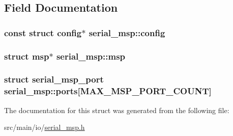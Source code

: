 \subsection{Field Documentation}
\hypertarget{structserial__msp_ad95949b17128a580c07bb01648295787}{
\subsubsection[{config}]{\setlength{\rightskip}{0pt plus 5cm}const struct {\bf config}$\ast$ serial\+\_\+msp\+::config}}\label{structserial__msp_ad95949b17128a580c07bb01648295787}
\hypertarget{structserial__msp_a2a967344a1665d488e933d2f05e3978d}{
\subsubsection[{msp}]{\setlength{\rightskip}{0pt plus 5cm}struct {\bf msp}$\ast$ serial\+\_\+msp\+::msp}}\label{structserial__msp_a2a967344a1665d488e933d2f05e3978d}
\hypertarget{structserial__msp_ae1f0b11113b9d5190cd1ae6c821d70e7}{
\subsubsection[{ports}]{\setlength{\rightskip}{0pt plus 5cm}struct {\bf serial\+\_\+msp\+\_\+port} serial\+\_\+msp\+::ports\mbox{[}{\bf M\+A\+X\+\_\+\+M\+S\+P\+\_\+\+P\+O\+R\+T\+\_\+\+C\+O\+U\+N\+T}\mbox{]}}}\label{structserial__msp_ae1f0b11113b9d5190cd1ae6c821d70e7}


The documentation for this struct was generated from the following file\+:\begin{DoxyCompactItemize}
\item 
src/main/io/\hyperlink{serial__msp_8h}{serial\+\_\+msp.\+h}\end{DoxyCompactItemize}
